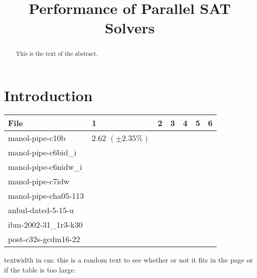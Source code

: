 \documentclass{article}
\begin{document}


 \newcommand{\assign}{$\,$:=$\;$}
\newcommand{\barc}{Barelogic$^S$}
\newcommand{\pling}{{\tt plingeling}}

\title{Performance of Parallel SAT Solvers}




\maketitle
\begin{abstract}
This is the text of the abstract.
\end{abstract}

\tableofcontents

\section{Introduction}

\begin{center}
    \begin{tabular}{ p{1.5cm} | p{1.5cm} | p{1.5cm} | p{1.5cm} | p{1.5cm} | p{1.5cm} | p{1.5cm} | }
    File & 1 & 2 & 3 & 4 & 5 & 6  \\ \hline
    manol-pipe-c10b & $2.62$ $(\pm 2.35\%)$ & & & & & \\ \hline
    manol-pipe-c6bid\_i & & & & & & \\ \hline
    manol-pipe-c6nidw\_i & & & & & & \\ \hline
    manol-pipe-c7idw & & & & & & \\ \hline
    manol-pipe-cha05-113 & & & & & & \\ \hline
    anbul-dated-5-15-u & & & & & & \\ \hline
    ibm-2002-31\_1r3-k30 & & & & & & \\ \hline
    post-c32s-gcdm16-22 & & & & & & \\ \hline
    \end{tabular}
\end{center}
textwidth in cm: \prntlen{\textwidth} this is a random text to see whether or not it fits in the page or if the table is too large.
\end{document}
